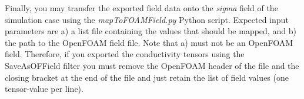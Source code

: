 Finally, you may transfer the exported field data onto the \emph{sigma} field of the simulation case using the 
\emph{mapToFOAMField.py} Python script. Expected input parameters are a) a list file containing the values that should
be mapped, and b) the path to the OpenFOAM field file. Note that a) must not be an OpenFOAM field. Therefore, if you exported
the conductivity tensors using the SaveAsOFField filter you must remove the OpenFOAM header of the file and the closing
bracket at the end of the file and just retain the list of field values (one tensor-value per line).
